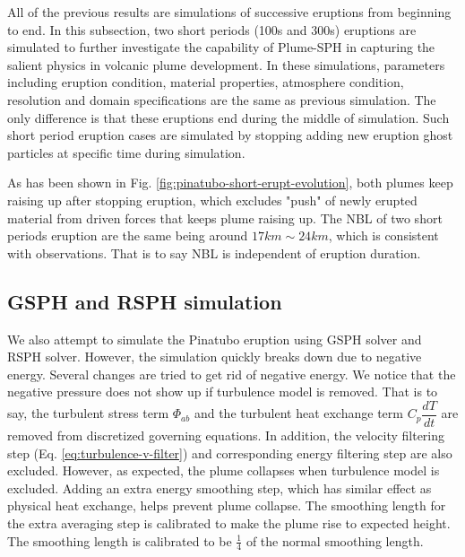 All of the previous results are simulations of successive eruptions from beginning to end. In this subsection, two short periods (100s and 300s) eruptions are simulated to further investigate the capability of Plume-SPH in capturing the salient physics in volcanic plume development. In these simulations, parameters including eruption condition, material properties, atmosphere condition, resolution and domain specifications are the same as previous simulation. The only difference is that these eruptions end during the middle of simulation. Such short period eruption cases are simulated by stopping adding new eruption ghost particles at specific time during simulation.

As has been shown in Fig. \ref{fig:pinatubo-short-erupt-evolution}, both plumes keep raising up after stopping eruption, which excludes "push" of newly erupted material from driven forces that keeps plume raising up. The NBL of two short periods eruption are the same being around $17 km \sim 24 km$, which is consistent with observations. That is to say NBL is independent of eruption duration.

\subsection{GSPH and RSPH simulation}
We also attempt to simulate the Pinatubo eruption using GSPH solver and RSPH solver. However, the simulation quickly breaks down due to negative energy. Several changes are tried to get rid of negative energy.
We notice that the negative pressure does not show up if turbulence model is removed. That is to say, the turbulent stress term $\Phi_{ab}$ and the turbulent heat exchange term $C_p \dfrac{dT}{dt}$ are removed from discretized governing equations. In addition, the velocity filtering step (Eq. \ref{eq:turbulence-v-filter}) and corresponding energy filtering step are also excluded. However, as expected, the plume collapses when turbulence model is excluded. Adding an extra energy smoothing step, which has similar effect as physical heat exchange, helps prevent plume collapse. The smoothing length for the extra averaging step is calibrated to make the plume rise  to expected height. The smoothing length is calibrated to be $\frac{1}{4}$  of the normal smoothing length.

